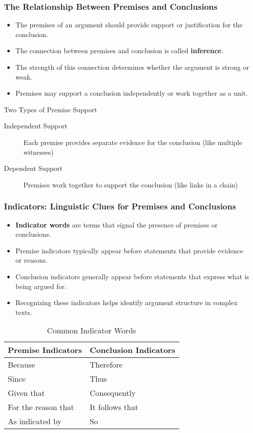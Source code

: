 \documentclass{beamer}
\begin{document}
\begin{frame}
    \frametitle{The Relationship Between Premises and Conclusions}
    \begin{itemize}
        \item The premises of an argument should provide support or justification for the conclusion.
        \item The connection between premises and conclusion is called \textbf{inference}.
        \item The strength of this connection determines whether the argument is strong or weak.
        \item Premises may support a conclusion independently or work together as a unit.
    \end{itemize}
    
    \begin{block}{Two Types of Premise Support}
        \begin{description}
            \item[Independent Support] Each premise provides separate evidence for the conclusion (like multiple witnesses)
            \item[Dependent Support] Premises work together to support the conclusion (like links in a chain)
        \end{description}
    \end{block}
\end{frame}

\begin{frame}
    \frametitle{Indicators: Linguistic Clues for Premises and Conclusions}
    \begin{itemize}
        \item \textbf{Indicator words} are terms that signal the presence of premises or conclusions.
        \item Premise indicators typically appear before statements that provide evidence or reasons.
        \item Conclusion indicators generally appear before statements that express what is being argued for.
        \item Recognizing these indicators helps identify argument structure in complex texts.
    \end{itemize}
    
    \begin{table}
        \begin{tabular}{|l|l|}
            \hline
            \textbf{Premise Indicators} & \textbf{Conclusion Indicators} \\
            \hline
            Because & Therefore \\
            Since & Thus \\
            Given that & Consequently \\
            For the reason that & It follows that \\
            As indicated by & So \\
            \hline
        \end{tabular}
        \caption{Common Indicator Words}
    \end{table}
\end{frame}
\end{document}
